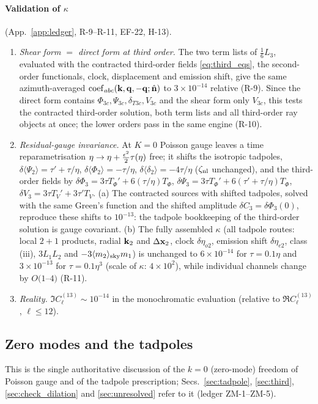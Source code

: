 \paragraph{Validation of $\kappa$} (App.~\ref{app:ledger}, R-9--R-11, EF-22, H-13).
\begin{enumerate}\itemsep1pt
\item \emph{Shear form $=$ direct form at third order.}  The two term lists of $\tfrac16L_3$, evaluated with the contracted third-order fields
\eqref{eq:third_eqs}, the second-order functionals, clock, displacement and emission shift, give the same azimuth-averaged
${\rm coef}_{abc}(\mathbf k,\mathbf q,-\mathbf q;\hat{\mathbf n})$ to $3\times10^{-14}$ relative (R-9).  Since the direct form contains $\Phi_{3c},\Psi_{3c},\delta_{T3c},V_{3c}$ and the
shear form only $V_{3c}$, this tests the contracted third-order solution, both term lists and all third-order ray objects at once; the lower orders
pass in the same engine (R-10).
\item \emph{Residual-gauge invariance.}  At $K=0$ Poisson gauge leaves a time reparametrisation $\eta\to\eta+\tfrac{\epsilon^2}2\tau(\eta)$ free; it
shifts the isotropic tadpoles, $\delta\langle\Psi_2\rangle=\tau'+\tau/\eta$, $\delta\langle\Phi_2\rangle=-\tau/\eta$, $\delta\langle\delta_2\rangle=-4\tau/\eta$
($\zeta_{\rm nl}$ unchanged), and the third-order fields by $\delta\Phi_3=3\tau T_\Phi'+6(\tau/\eta)T_\Phi$, $\delta\Psi_3=3\tau T_\Phi'+6(\tau'+\tau/\eta)T_\Phi$,
$\delta V_3=3\tau T_V'+3\tau'T_V$.  (a) The contracted sources with shifted tadpoles, solved with the same Green's function and the shifted
amplitude $\delta C_3=\delta\Phi_3(0)$, reproduce these shifts to $10^{-13}$: the tadpole bookkeeping of the third-order solution is gauge
covariant.  (b) The fully assembled $\kappa$ (all tadpole routes: local $2{+}1$ products, radial $\mathbf k_2$ and $\Delta\mathbf x_2$, clock $\delta\eta_{o2}$,
emission shift $\delta\eta_{e2}$, class (iii), $3L_1L_2$ and $-3\langle m_2\rangle_{\rm sky}m_1$) is unchanged to $6\times10^{-14}$ for $\tau=0.1\eta$ and $3\times10^{-13}$
for $\tau=0.1\eta^3$ (scale of $\kappa$: $4\times10^2$), while individual channels change by $O(1$--$4)$ (R-11).
\item \emph{Reality.}  $\Im C^{(13)}_\ell\sim10^{-14}$ in the monochromatic evaluation (relative to $\Re C^{(13)}_\ell$, $\ell\le12$).
\end{enumerate}

\subsection{Zero modes and the tadpoles}
\label{sec:asm-zeromodes}
This is the single authoritative discussion of the $k=0$ (zero-mode) freedom of Poisson gauge and of the tadpole prescription; Secs.~\ref{sec:tadpole},
\ref{sec:third}, \ref{sec:check_dilation} and \ref{sec:unresolved} refer to it (ledger ZM-1--ZM-5).

